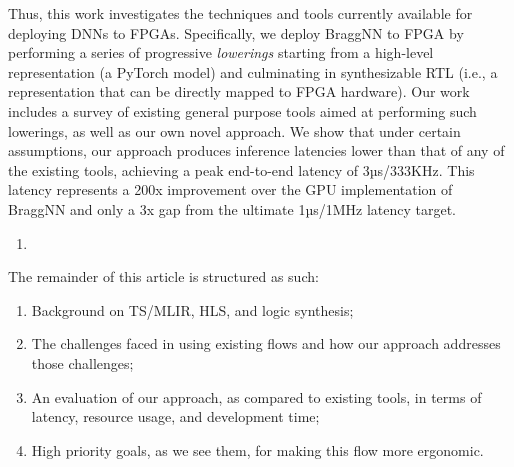 Thus, this work investigates the techniques and tools currently available for deploying DNNs to FPGAs.
Specifically, we deploy BraggNN to FPGA by performing a series of progressive \emph{lowerings} starting from a high-level representation (a PyTorch model) and culminating in synthesizable RTL (i.e., a representation that can be directly mapped to FPGA hardware).
Our work includes a survey of existing general purpose tools aimed at performing such lowerings, as well as our own novel approach.
We show that under certain assumptions, our approach produces inference latencies lower than that of any of the existing tools, achieving a peak end-to-end latency of 3µs/333KHz.
This latency represents a 200x improvement over the GPU implementation of BraggNN and only a 3x gap from the ultimate 1µs/1MHz latency target.


\begin{enumerate}
	\item
\end{enumerate}
The remainder of this article is structured as such:
\begin{enumerate}
	\item Background on TS/MLIR, HLS, and logic synthesis;
	\item The challenges faced in using existing flows and how our approach addresses those challenges;
	\item An evaluation of our approach, as compared to existing tools, in terms of latency, resource usage, and development time;
	\item High priority goals, as we see them, for making this flow more ergonomic.
\end{enumerate}



